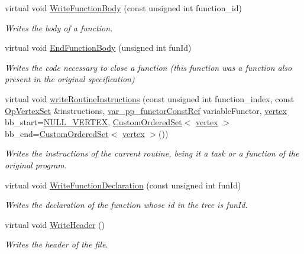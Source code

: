 \begin{DoxyCompactItemize}
virtual void \hyperlink{classCWriter_a7fa84e0feec4e832e2f2119e97cd7a3c}{Write\+Function\+Body} (const unsigned int function\+\_\+id)
\begin{DoxyCompactList}\small\item\em Writes the body of a function. \end{DoxyCompactList}\item 
virtual void \hyperlink{classCWriter_aac63c089d71f0541d08bf3790a829645}{End\+Function\+Body} (unsigned int fun\+Id)
\begin{DoxyCompactList}\small\item\em Writes the code necessary to close a function (this function was a function also present in the original specification) \end{DoxyCompactList}\item 
virtual void \hyperlink{classCWriter_a7810dd571d72debb400b889f8366848a}{write\+Routine\+Instructions} (const unsigned int function\+\_\+index, const \hyperlink{classOpVertexSet}{Op\+Vertex\+Set} \&instructions, \hyperlink{var__pp__functor_8hpp_a8a6b51b6519401d911398943510557f0}{var\+\_\+pp\+\_\+functor\+Const\+Ref} variable\+Functor, \hyperlink{graph_8hpp_abefdcf0544e601805af44eca032cca14}{vertex} bb\+\_\+start=\hyperlink{graph_8hpp_ac3c33c45c396860b76e8aff4dd2b8158}{N\+U\+L\+L\+\_\+\+V\+E\+R\+T\+EX}, \hyperlink{classCustomOrderedSet}{Custom\+Ordered\+Set}$<$ \hyperlink{graph_8hpp_abefdcf0544e601805af44eca032cca14}{vertex} $>$ bb\+\_\+end=\hyperlink{classCustomOrderedSet}{Custom\+Ordered\+Set}$<$ \hyperlink{graph_8hpp_abefdcf0544e601805af44eca032cca14}{vertex} $>$())
\begin{DoxyCompactList}\small\item\em Writes the instructions of the current routine, being it a task or a function of the original program. \end{DoxyCompactList}\item 
virtual void \hyperlink{classCWriter_ad46d65f0cf64c09ce854032f15ffdd9e}{Write\+Function\+Declaration} (const unsigned int fun\+Id)
\begin{DoxyCompactList}\small\item\em Writes the declaration of the function whose id in the tree is fun\+Id. \end{DoxyCompactList}\item 
virtual void \hyperlink{classCWriter_a04b8381e64ef2e49ec7cfc308e10e10a}{Write\+Header} ()
\begin{DoxyCompactList}\small\item\em Writes the header of the file. \end{DoxyCompactList}\item 

\end{DoxyCompactItemize}
